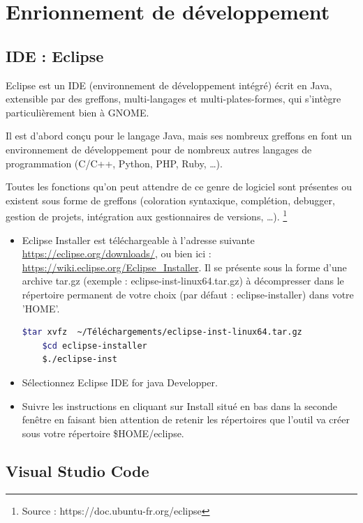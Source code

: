 	\section{Enrionnement de développement}
	\subsection{IDE : Eclipse}
	Eclipse est un IDE (environnement de développement intégré) écrit en Java, extensible par des greffons, multi-langages et multi-plates-formes, qui s'intègre particulièrement bien à GNOME.
	
	Il est d'abord conçu pour le langage Java, mais ses nombreux greffons en font un environnement de développement pour de nombreux autres langages de programmation (C/C++, Python, PHP, Ruby, …).
	
	Toutes les fonctions qu'on peut attendre de ce genre de logiciel sont présentes ou existent sous forme de greffons (coloration syntaxique, complétion, debugger, gestion de projets, intégration aux gestionnaires de versions, …). \footnote{Source : https://doc.ubuntu-fr.org/eclipse}
	
	
	\begin{itemize}
		\item  Eclipse Installer est téléchargeable à l'adresse suivante \url{https://eclipse.org/downloads/}, ou bien ici : \url{https://wiki.eclipse.org/Eclipse\_Installer}. Il se présente sous la forme d'une archive tar.gz (exemple : eclipse-inst-linux64.tar.gz) à décompresser dans le répertoire permanent de votre choix (par défaut : eclipse-installer) dans votre 'HOME'. 
	\begin{lstlisting}[language=bash]   
	$tar xvfz  ~/Téléchargements/eclipse-inst-linux64.tar.gz
	$cd eclipse-installer
	$./eclipse-inst
	\end{lstlisting}
	\item Sélectionnez Eclipse IDE for java Developper. 
	
	
	\item Suivre les instructions en cliquant sur {\color{orange}Install} situé en bas dans la seconde fenêtre en faisant bien attention de retenir les répertoires que l'outil va créer sous votre répertoire \$HOME/eclipse. 
\end{itemize}
	\subsection{Visual Studio Code}
	
